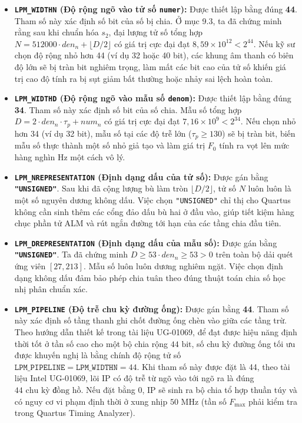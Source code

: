 \begin{itemize}[leftmargin=1.5em, itemsep=4pt]
    \item \textbf{\texttt{LPM\_WIDTHN} (Độ rộng ngõ vào tử số \texttt{numer}):} Được thiết lập bằng đúng \textbf{44}. 
    Tham số này xác định số bit của số bị chia. Ở mục 9.3, ta đã chứng minh rằng sau khi chuẩn hóa $s_2$, đại lượng tử số tổng hợp $N = 512000 \cdot den_n + \lfloor D / 2 \rfloor$ có giá trị cực đại đạt $8{,}59 \times 10^{12} < 2^{44}$. Nếu kỹ sư chọn độ rộng nhỏ hơn 44 (ví dụ 32 hoặc 40 bit), các khung âm thanh có biên độ lớn sẽ bị tràn bit nghiêm trọng, làm mất các bit cao của tử số khiến giá trị cao độ tính ra bị sụt giảm bất thường hoặc nhảy sai lệch hoàn toàn.

    \item \textbf{\texttt{LPM\_WIDTHD} (Độ rộng ngõ vào mẫu số \texttt{denom}):} Được thiết lập bằng đúng \textbf{34}.
    Tham số này xác định số bit của số chia. Mẫu số tổng hợp $D = 2 \cdot den_n \cdot \tau_p + num_n$ có giá trị cực đại đạt $7{,}16 \times 10^9 < 2^{34}$. Nếu chọn nhỏ hơn 34 (ví dụ 32 bit), mẫu số tại các độ trễ lớn ($\tau_p \ge 130$) sẽ bị tràn bit, biến mẫu số thực thành một số nhỏ giả tạo và làm giá trị $F_0$ tính ra vọt lên mức hàng nghìn Hz một cách vô lý.

    \item \textbf{\texttt{LPM\_NREPRESENTATION} (Định dạng dấu của tử số):} Được gán bằng \textbf{\texttt{"UNSIGNED"}}.
    Sau khi đã cộng lượng bù làm tròn $\lfloor D / 2 \rfloor$, tử số $N$ luôn luôn là một số nguyên dương không dấu. Việc chọn \texttt{"UNSIGNED"} chỉ thị cho Quartus không cần sinh thêm các cổng đảo dấu bù hai ở đầu vào, giúp tiết kiệm hàng chục phần tử ALM và rút ngắn đường tới hạn của các tầng chia đầu tiên.

    \item \textbf{\texttt{LPM\_DREPRESENTATION} (Định dạng dấu của mẫu số):} Được gán bằng \textbf{\texttt{"UNSIGNED"}}.
    Ta đã chứng minh $D \ge 53 \cdot den_n \ge 53 > 0$ trên toàn bộ dải quét ứng viên $[27, 213]$. Mẫu số luôn luôn dương nghiêm ngặt. Việc chọn định dạng không dấu đảm bảo phép chia tuân theo đúng thuật toán chia số học nhị phân chuẩn xác.

    \item \textbf{\texttt{LPM\_PIPELINE} (Độ trễ chu kỳ đường ống):} Được gán bằng \textbf{44}.
    Tham số này xác định số tầng thanh ghi chốt đường ống chèn vào giữa các tầng trừ. Theo hướng dẫn thiết kế trong tài liệu UG-01069, để đạt được hiệu năng định thời tốt ở tần số cao cho một bộ chia rộng $44\text{ bit}$, số chu kỳ đường ống tối ưu được khuyến nghị là bằng chính độ rộng tử số $\texttt{LPM\_PIPELINE} = \texttt{LPM\_WIDTHN} = 44$. Khi tham số này được đặt là 44, theo tài liệu Intel UG-01069, lõi IP có độ trễ từ ngõ vào tới ngõ ra là đúng $44\text{ chu kỳ đồng hồ}$. Nếu đặt bằng 0, IP sẽ sinh ra bộ chia tổ hợp thuần túy và có nguy cơ vi phạm định thời ở xung nhịp $50\text{ MHz}$ (tần số $F_{\max}$ phải kiểm tra trong Quartus Timing Analyzer).


\end{itemize}
